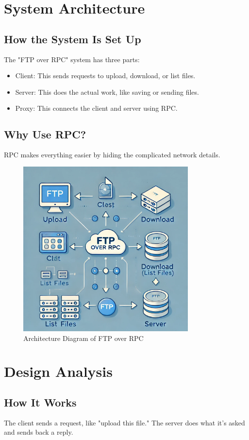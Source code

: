 \documentclass[a4paper,12pt]{article}
\begin{document}
\section{System Architecture}
\subsection{How the System Is Set Up}
The "FTP over RPC" system has three parts:
\begin{itemize}
    \item Client: This sends requests to upload, download, or list files.
    \item Server: This does the actual work, like saving or sending files.
    \item Proxy: This connects the client and server using RPC.
\end{itemize}

\subsection{Why Use RPC?}
RPC makes everything easier by hiding the complicated network details.
\begin{figure}[h]
    \centering
    \includegraphics[width=0.8\textwidth]{1.png} 
    \caption{Architecture Diagram of FTP over RPC}
\end{figure}
\section{Design Analysis}
\subsection{How It Works}
The client sends a request, like "upload this file." The server does what it’s asked and sends back a reply.
\end{document}
